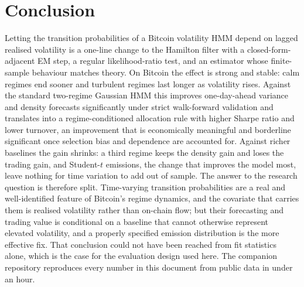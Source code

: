 \documentclass[11pt,a4paper]{article}
\begin{document}
\section{Conclusion}\label{sec:conclusion}
Letting the transition probabilities of a Bitcoin volatility HMM depend on lagged realised volatility is a one-line change to the Hamilton filter with a closed-form-adjacent EM step, a regular likelihood-ratio test, and an estimator whose finite-sample behaviour matches theory. On Bitcoin the effect is strong and stable: calm regimes end sooner and turbulent regimes last longer as volatility rises. Against the standard two-regime Gaussian HMM this improves one-day-ahead variance and density forecasts significantly under strict walk-forward validation and translates into a regime-conditioned allocation rule with higher Sharpe ratio and lower turnover, an improvement that is economically meaningful and borderline significant once selection bias and dependence are accounted for. Against richer baselines the gain shrinks: a third regime keeps the density gain and loses the trading gain, and Student-$t$ emissions, the change that improves the model most, leave nothing for time variation to add out of sample. The answer to the research question is therefore split. Time-varying transition probabilities are a real and well-identified feature of Bitcoin's regime dynamics, and the covariate that carries them is realised volatility rather than on-chain flow; but their forecasting and trading value is conditional on a baseline that cannot otherwise represent elevated volatility, and a properly specified emission distribution is the more effective fix. That conclusion could not have been reached from fit statistics alone, which is the case for the evaluation design used here. The companion repository reproduces every number in this document from public data in under an hour.

\setlength{\bibsep}{3pt}
{\small
}
\end{document}
